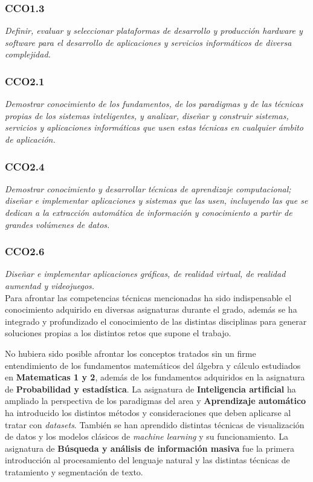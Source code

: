 \subsubsection{CCO1.3}\textit{Definir, evaluar y seleccionar plataformas de desarrollo y producción hardware y software para el desarrollo de aplicaciones y servicios informáticos de diversa complejidad.}%
\subsubsection{CCO2.1}\textit{Demostrar conocimiento de los fundamentos, de los paradigmas y de las técnicas propias de los sistemas inteligentes, y analizar, diseñar y construir sistemas, servicios y aplicaciones informáticas que usen estas técnicas en cualquier ámbito de aplicación.}%
\subsubsection{CCO2.4}\textit{Demostrar conocimiento y desarrollar técnicas de aprendizaje computacional; diseñar e implementar aplicaciones y sistemas que las usen, incluyendo las que se dedican a la extracción automática de información y conocimiento a partir de grandes volúmenes de datos.}%
\subsubsection{CCO2.6}\textit{Diseñar e implementar aplicaciones gráficas, de realidad virtual, de realidad aumentad y videojuegos.}%
\\

Para afrontar las competencias técnicas mencionadas ha sido indispensable el conocimiento adquirido en diversas asignaturas durante el grado, además se ha integrado y profundizado el conocimiento de las distintas disciplinas para generar soluciones propias a los distintos retos que supone el trabajo.

No hubiera sido posible afrontar los conceptos tratados sin un firme entendimiento de los fundamentos matemáticos del álgebra y cálculo estudiados en \textbf{Matematicas 1 y 2}, además de los fundamentos adquiridos en la asignatura de \textbf{Probabilidad y estadística}.
La asignatura de \textbf{Inteligencia artificial} ha ampliado la perspectiva de los paradigmas del area y \textbf{Aprendizaje automático} ha introducido los distintos métodos y consideraciones que deben aplicarse al tratar con \textit{datasets}. También se han aprendido distintas técnicas de visualización de datos y los modelos clásicos de \textit{machine learning} y su funcionamiento.
La asignatura de \textbf{Búsqueda y análisis de información masiva} fue la primera introducción al procesamiento del lenguaje natural y las distintas técnicas de tratamiento y segmentación de texto.

